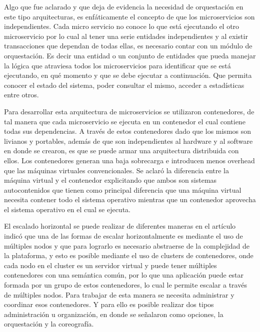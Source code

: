 Algo que fue aclarado y que deja de evidencia la necesidad de orquestación en este tipo arquitecturas, es enfáticamente el concepto de que los microservicios son independientes.
Cada micro servicio no conoce lo que está ejecutando el otro microservicio por lo cual al tener una serie entidades independientes y al existir transacciones que dependan de todas ellas, es necesario contar con un módulo de orquestación.
Es decir una entidad o un conjunto de entidades que pueda manejar la lógica que atraviesa todos los microservicios para identificar que se está ejecutando, en qué momento y que se debe ejecutar a continuación.
Que permita conocer el estado del sistema, poder consultar el mismo, acceder a estadísticas entre otros.\par

Para desarrollar esta arquitectura de microservicios se utilizaron contenedores, de tal manera que cada microservicio se ejecuta en un contenedor el cual contiene todas sus dependencias.
A través de estos contenedores dado que los mismos son livianos y portables, además de que son independientes al hardware y al software en donde se crearon, es que se puede armar una arquitectura distribuida con ellos.
Los contenedores generan una baja sobrecarga e introducen menos overhead que las máquinas virtuales convencionales.
Se aclaró la diferencia entre la máquina virtual y el contenedor explicitando que ambos son sistemas autocontenidos que tienen como principal diferencia que una máquina virtual necesita contener todo el sistema operativo mientras que un contenedor aprovecha el sistema operativo en el cual se ejecuta.\par

El escalado horizontal se puede realizar de diferentes maneras en el artículo indicó que una de las formas de escalar horizontalmente es mediante el uso de múltiples nodos y que para lograrlo es necesario abstraerse de la complejidad de la plataforma, y esto es posible mediante el uso de clusters de contenedores, onde cada nodo en el cluster es un servidor virtual y puede tener múltiples contenedores con una semántica común,
por lo que una aplicación puede estar formada por un grupo de estos contenedores, lo cual le permite escalar a través de múltiples nodos.
Para trabajar de esta manera se necesita administrar y coordinar esos contenedores.
Y para ello es posible realizar dos tipos administración u organización, en donde se señalaron como opciones, la orquestación y la coreografía.\par


